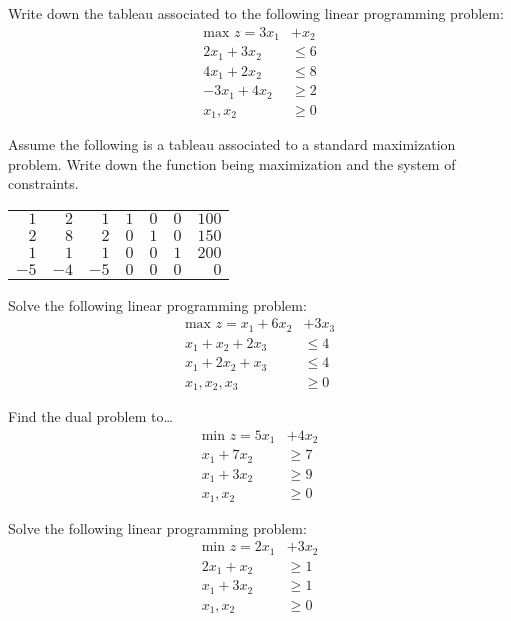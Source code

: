 \documentclass[11pt,letterpaper]{article}
\begin{document}

 Write down the tableau associated to the following linear programming problem:
	\[
	\begin{aligned}
	\text{max }  z= 3x_1 &+ x_2 \\
	2x_1 + 3x_2&\leq 6 \\
	4x_1 + 2x_2&\leq 8 \\
	-3x_1 + 4x_2&\geq 2 \\
	x_1, x_2&\geq 0
	\end{aligned}
	\]



\newpage



 Assume the following is a tableau associated to a standard maximization problem. Write down the function being maximization and the system of constraints. 
	\begin{table}[!ht]
	\centering
	\begin{tabular}{rrrrrr|r}
	$1$ & $2$ & $1$ & $1$ & $0$ & $0$ & $100$ \\
	$2$ & $8$ & $2$ & $0$ & $1$ & $0$ & $150$ \\
	$1$ & $1$ & $1$ & $0$ & $0$ & $1$ & $200$ \\ \hline
	$-5$ & $-4$ & $-5$ & $0$ & $0$ & $0$ & $0$
	\end{tabular}
	\end{table}



\newpage



 Solve the following linear programming problem:
	\[
	\begin{aligned}
	\text{max } z= x_1 + 6x_2& + 3x_3 \\
	x_1 + x_2 + 2x_3&\leq 4 \\
	x_1 + 2x_2 + x_3&\leq 4 \\
	x_1, x_2, x_3&\geq 0 
	\end{aligned}
	\]




\newpage




 Find the dual problem to\dots
	\[
	\begin{aligned}
	\text{min } z= 5x_1 &+ 4x_2 \\
	x_1 + 7x_2&\geq 7 \\
	x_1 + 3x_2&\geq 9 \\
	x_1, x_2&\geq 0 
	\end{aligned}
	\]




\newpage



 Solve the following linear programming problem:
	\[
	\begin{aligned}
	\text{min } z= 2x_1 &+ 3x_2 \\
	2x_1 + x_2&\geq 1 \\
	x_1 + 3x_2&\geq 1 \\
	x_1, x_2&\geq 0 
	\end{aligned}
	\]
\end{document}
